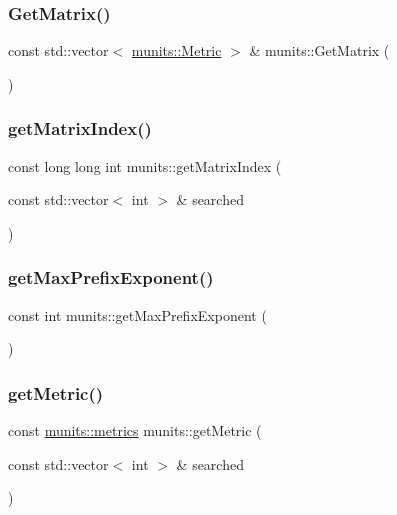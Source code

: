 \subsubsection{\texorpdfstring{Get\+Matrix()}{GetMatrix()}}
{\footnotesize\ttfamily const std\+::vector$<$ \hyperlink{structmunits_1_1_metric}{munits\+::\+Metric} $>$ \& munits\+::\+Get\+Matrix (\begin{DoxyParamCaption}{ }\end{DoxyParamCaption})}

\mbox{\label{namespacemunits_a31a640e781f471e914e53e370cdf63ef}} 
\subsubsection{\texorpdfstring{get\+Matrix\+Index()}{getMatrixIndex()}}
{\footnotesize\ttfamily const long long int munits\+::get\+Matrix\+Index (\begin{DoxyParamCaption}\item[{const std\+::vector$<$ int $>$ \&}]{searched }\end{DoxyParamCaption})}

\mbox{\label{namespacemunits_a49bfbd8f3668a72e3d5404be4a4ee0df}} 
\subsubsection{\texorpdfstring{get\+Max\+Prefix\+Exponent()}{getMaxPrefixExponent()}}
{\footnotesize\ttfamily const int munits\+::get\+Max\+Prefix\+Exponent (\begin{DoxyParamCaption}{ }\end{DoxyParamCaption})}

\mbox{\label{namespacemunits_a252f17286e532b20b64968b1c7f80f7e}} 
\subsubsection{\texorpdfstring{get\+Metric()}{getMetric()}}
{\footnotesize\ttfamily const \hyperlink{namespacemunits_a22c8effe19fdc3eb888884aa217f0c25}{munits\+::metrics} munits\+::get\+Metric (\begin{DoxyParamCaption}\item[{const std\+::vector$<$ int $>$ \&}]{searched }\end{DoxyParamCaption})}

